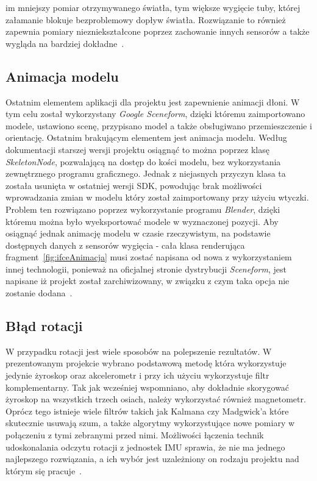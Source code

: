 im mniejszy pomiar otrzymywanego światła, tym większe wygięcie tuby, której załamanie blokuje bezproblemowy dopływ światła. Rozwiązanie to również zapewnia pomiary niezniekształcone poprzez zachowanie innych sensorów a także wygląda na bardziej dokładne~\cite{ledsensor}.
 
 
  \subsection{Animacja modelu}
 \label{subsec:iuAnimacja}
 Ostatnim elementem aplikacji dla projektu jest zapewnienie animacji dłoni. W tym celu został wykorzystany \textit{Google Sceneform}, dzięki któremu zaimportowano modele, ustawiono scenę, przypisano model a także obsługiwano przemieszczenie i orientację. Ostatnim brakującym elementem jest animacja modelu. Według dokumentacji starszej wersji projektu osiągnąć to można poprzez klasę \textit{SkeletonNode}, pozwalającą na dostęp do kości modelu, bez wykorzystania zewnętrznego programu graficznego. Jednak z niejasnych przyczyn klasa ta została usunięta w ostatniej wersji SDK, powodując brak możliwości wprowadzania zmian w modelu który został zaimportowany przy użyciu wtyczki. Problem ten rozwiązano poprzez wykorzystanie programu \textit{Blender}, dzięki któremu można było wyeksportować modele w wyznaczonej pozycji. Aby osiągnąć jednak animację modelu w czasie rzeczywistym, na podstawie dostępnych danych z sensorów wygięcia - cała klasa renderująca fragment~\ref{fig:ifceAnimacja} musi zostać napisana od nowa z wykorzystaniem innej technologii, ponieważ na oficjalnej stronie dystrybucji \textit{Sceneform}, jest napisane iż projekt został zarchiwizowany, w związku z czym taka opcja nie zostanie dodana~\cite{sceneform}. 
 
  \subsection{Błąd rotacji}
 \label{subsec:iuRotacja}
 W przypadku rotacji jest wiele sposobów na polepszenie rezultatów. W prezentowanym projekcie wybrano podstawową metodę która wykorzystuje jedynie żyroskop oraz akcelerometr i przy ich użyciu wykorzystuje filtr komplementarny. Tak jak wcześniej wspomniano, aby dokładnie skorygować żyroskop na wszystkich trzech osiach, należy wykorzystać również magnetometr. Oprócz tego istnieje wiele filtrów takich jak Kalmana czy Madgwick'a które skutecznie usuwają szum, a także algorytmy wykorzystujące nowe pomiary w połączeniu z tymi zebranymi przed nimi. Możliwości łączenia technik udoskonalania odczytu rotacji z jednostek IMU sprawia, że nie ma jednego najlepszego rozwiązania, a ich wybór jest uzależniony on rodzaju projektu nad którym się pracuje~\cite{sensorslab}. 
 
